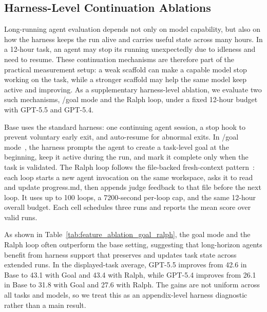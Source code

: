 \subsection{Harness-Level Continuation Ablations}
\label{sec:ablation-experiment-setting}
\label{sec:appendix-ablation-setting}

Long-running agent evaluation depends not only on model capability, but also on how the harness keeps the run alive and carries useful state across many hours. In a 12-hour task, an agent may stop its running unexpectedly due to idleness and need to resume. These continuation mechanisms are therefore part of the practical measurement setup: a weak scaffold can make a capable model stop working on the task, while a stronger scaffold may help the same model keep active and improving. As a supplementary harness-level ablation, we evaluate two such mechanisms, /goal mode and the Ralph loop, under a fixed 12-hour budget with GPT-5.5 and GPT-5.4.

Base uses the standard harness: one continuing agent session, a stop hook to prevent voluntary early exit, and auto-resume for abnormal exits. In /goal mode~\cite{openai2026codexgoals}, the harness prompts the agent to create a task-level goal at the beginning, keep it active during the run, and mark it complete only when the task is validated. The Ralph loop follows the file-backed fresh-context pattern~\cite{huntley2026ralphloop}: each loop starts a new agent invocation on the same workspace, asks it to read and update progress.md, then appends judge feedback to that file before the next loop. It uses up to 100 loops, a 7200-second per-loop cap, and the same 12-hour overall budget. Each cell schedules three runs and reports the mean score over valid runs.



As shown in Table~\ref{tab:feature_ablation_goal_ralph}, the goal mode and the Ralph loop often outperform the base setting, suggesting that long-horizon agents benefit from harness support that preserves and updates task state across extended runs. In the displayed-task average, GPT-5.5 improves from 42.6 in Base to 43.1 with Goal and 43.4 with Ralph, while GPT-5.4 improves from 26.1 in Base to 31.8 with Goal and 27.6 with Ralph. The gains are not uniform across all tasks and models, so we treat this as an appendix-level harness diagnostic rather than a main result.

